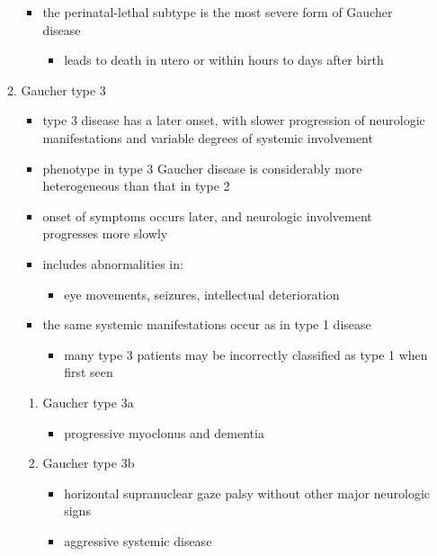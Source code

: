 \documentclass{scrartcl}
\begin{document}
\begin{enumerate}
\begin{enumerate}
\begin{itemize}
\item the perinatal-lethal subtype is the most severe form of Gaucher
disease
\begin{itemize}
\item leads to death in utero or within hours to days after
birth
\end{itemize}
\end{itemize}

\item Gaucher type 3
\label{sec:org2c27904}
\begin{itemize}
\item type 3 disease has a later onset, with slower progression of
neurologic manifestations and variable degrees of systemic
involvement
\item phenotype in type 3 Gaucher disease is considerably more
heterogeneous than that in type 2

\item onset of symptoms occurs later, and neurologic involvement
progresses more slowly

\item includes abnormalities in:
\begin{itemize}
\item eye movements, seizures, intellectual deterioration
\end{itemize}

\item the same systemic manifestations occur as in type 1 disease
\begin{itemize}
\item many type 3 patients may be incorrectly classified as type 1 when
first seen
\end{itemize}
\end{itemize}

\begin{enumerate}
\item Gaucher type 3a
\label{sec:org0787285}
\begin{itemize}
\item progressive myoclonus and dementia
\end{itemize}

\item Gaucher type 3b
\label{sec:org166b3e8}
\begin{itemize}
\item horizontal supranuclear gaze palsy without other major
neurologic signs
\item aggressive systemic disease
\end{itemize}


\end{enumerate}
\end{enumerate}
\end{enumerate}
\end{document}
